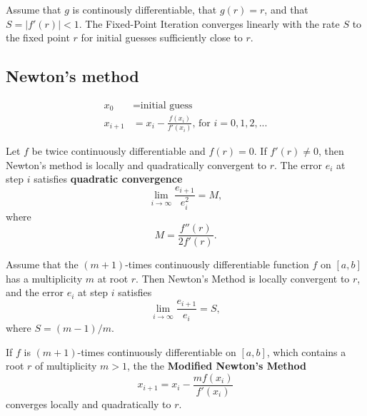 \begin{theorem*}
Assume that $g$ is continously differentiable, that $g(r) = r$, and that $S = |f'(r)| < 1$. The Fixed-Point Iteration converges linearly with the rate $S$ to the fixed point $r$ for initial guesses sufficiently close to $r$.
\end{theorem*}

\subsection{Newton's method} 
\begin{align*}
x_0 & = \text{initial guess} \\
x_{i+1} &= x_i - \frac{f(x_i)}{f'(x_i)} \text{, for } i = 0,1,2,...
\end{align*}

\begin{theorem*}
Let $f$ be twice continuously differentiable and $f(r) = 0$. If $f'(r) \neq 0$, then Newton's method is locally and quadratically convergent to $r$. The error $e_i$ at step $i$ satisfies \textbf{quadratic convergence}
$$
\lim_{i \to \infty} \frac{e_{i+1}}{e_{i}^2} = M,
$$
where
$$
M = \frac{f''(r)}{2f'(r)}.
$$
\end{theorem*}

\begin{theorem*}
Assume that the $(m+1)$-times continuously differentiable function $f$ on $[a,b]$ has a multiplicity $m$ at root $r$. Then Newton's Method is locally convergent to $r$, and the error $e_i$ at step $i$ satisfies
$$
\lim_{i \to \infty} \frac{e_{i+1}}{e_{i}} = S,
$$
where $S = (m-1)/m$.
\end{theorem*}

\begin{theorem*}
If $f$ is $(m+1)$-times continuously differentiable on $[a,b]$, which contains a root $r$ of multiplicity $m > 1$, the the \textbf{Modified Newton's Method}
$$
x_{i+1} = x_i - \frac{m f(x_i)}{f'(x_i)}
$$
converges locally and quadratically to $r$.
\end{theorem*}
